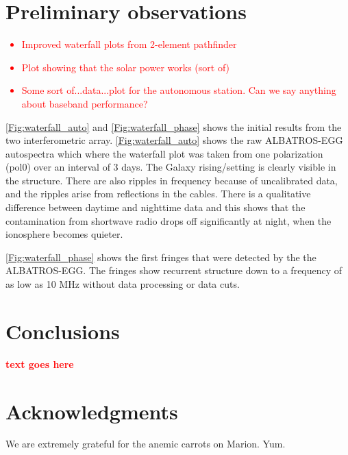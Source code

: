 \documentclass{ws-jai}
\newcommand{\attention}[1]{\textcolor{red}{\bf {#1}}}
\begin{document}
\section{Preliminary observations}

\attention{\begin{itemize}
    \item{Improved waterfall plots from 2-element pathfinder}
    \item{Plot showing that the solar power works (sort of)}
    \item{Some sort of...data...plot for the autonomous station.  Can
      we say anything about baseband performance?}
  \end{itemize}
}

\autoref{Fig:waterfall_auto} and \autoref{Fig:waterfall_phase} shows
the initial results from the two interferometric array.
\autoref{Fig:waterfall_auto} shows the raw ALBATROS-EGG autospectra
which where the waterfall plot was taken from one polarization (pol0)
over an interval of 3 days. The Galaxy rising/setting is clearly
visible in the structure. There are also ripples in frequency because
of uncalibrated data, and the ripples arise from reflections in the
cables. There is a qualitative difference between daytime and
nighttime data and this shows that the contamination from shortwave
radio drops off significantly at night, when the ionosphere becomes
quieter.

\autoref{Fig:waterfall_phase} shows the first fringes that were
detected by the the ALBATROS-EGG. The fringes show recurrent structure
down to a frequency of as low as 10 MHz without data processing or
data cuts.

\section{Conclusions}

\attention{text goes here}

	
\section*{Acknowledgments}

We are extremely grateful for the anemic carrots on Marion.  Yum.


{}
\end{document}
